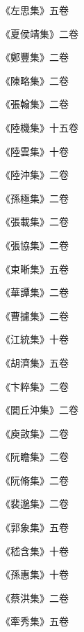 \begin{pinyinscope}
 《左思集》五卷



 《夏侯靖集》二卷



 《鄭豐集》二卷



 《陳略集》二卷



 《張翰集》二卷



 《陸機集》十五卷



 《陸雲集》十卷



 《陸沖集》二卷



 《孫極集》二卷



 《張載集》二卷



 《張協集》二卷



 《束晰集》五卷



 《華譚集》二卷



 《曹攄集》二卷



 《江統集》十卷



 《胡濟集》五卷



 《卞粹集》二卷



 《閭丘沖集》二卷



 《庾敳集》二卷



 《阮瞻集》二卷



 《阮脩集》二卷



 《裴邈集》二卷



 《郭象集》五卷



 《嵇含集》十卷



 《孫惠集》十卷



 《蔡洪集》二卷



 《牽秀集》五卷




\end{pinyinscope}
